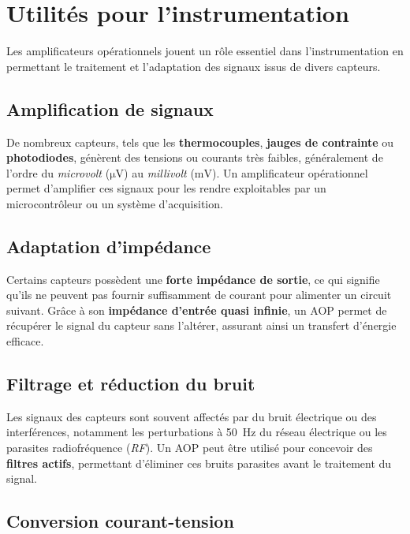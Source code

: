 \section{Utilités pour l’instrumentation}

Les amplificateurs opérationnels jouent un rôle essentiel dans l’instrumentation 
en permettant le traitement et l’adaptation des signaux issus de divers capteurs.

\subsection{Amplification de signaux}

De nombreux capteurs, tels que les \textbf{thermocouples}, 
\textbf{jauges de contrainte} ou \textbf{photodiodes}, génèrent des tensions ou 
courants très faibles, généralement de l’ordre du \textit{microvolt} (\(\unit{\micro\volt}\)) 
au \textit{millivolt} (\(\unit{\milli\volt}\)). Un amplificateur opérationnel 
permet d’amplifier ces signaux pour les rendre exploitables par un microcontrôleur 
ou un système d’acquisition.

\subsection{Adaptation d’impédance}

Certains capteurs possèdent une \textbf{forte impédance de sortie}, ce qui 
signifie qu’ils ne peuvent pas fournir suffisamment de courant pour alimenter un 
circuit suivant. Grâce à son \textbf{impédance d’entrée quasi infinie}, un AOP 
permet de récupérer le signal du capteur sans l’altérer, assurant ainsi un 
transfert d’énergie efficace.

\subsection{Filtrage et réduction du bruit}

Les signaux des capteurs sont souvent affectés par du bruit électrique ou des 
interférences, notamment les perturbations à \SI{50}{Hz} du réseau électrique 
ou les parasites radiofréquence (\textit{RF}). Un AOP peut être utilisé pour 
concevoir des \textbf{filtres actifs}, permettant d’éliminer ces bruits 
parasites avant le traitement du signal.

\subsection{Conversion courant-tension}

